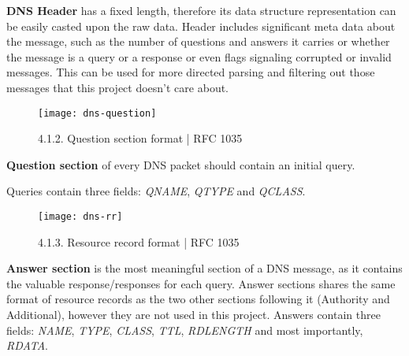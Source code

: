 \textbf{DNS Header} has a fixed length, therefore its data structure representation can be easily casted upon the raw data.
Header includes significant meta data about the message, such as the number of questions and answers it carries 
or whether the message is a query or a response or even flags signaling corrupted or invalid messages.
This can be used for more directed parsing and filtering out those messages that this project doesn't care about.

\vspace{1cm}
\begin{figure}[h]
\texttt{[image: dns-question]}
\centering
\caption{4.1.2. Question section format | RFC 1035}
\end{figure}

\textbf{Question section} of every DNS packet should contain an initial query. 

Queries contain three fields: \textit{QNAME}, \textit{QTYPE} and \textit{QCLASS}.

\vspace{1cm}
\begin{figure}[h]
\texttt{[image: dns-rr]}
\centering
\caption{4.1.3. Resource record format | RFC 1035}
\end{figure}

\textbf{Answer section} is the most meaningful section of a DNS message, as it contains the valuable response/responses for each query.
Answer sections shares the same format of resource records as the two other sections following it (Authority and Additional), however they are not used in this project.
Answers contain three fields: \textit{NAME}, \textit{TYPE}, \textit{CLASS}, \textit{TTL}, \textit{RDLENGTH} and most importantly, \textit{RDATA}.




